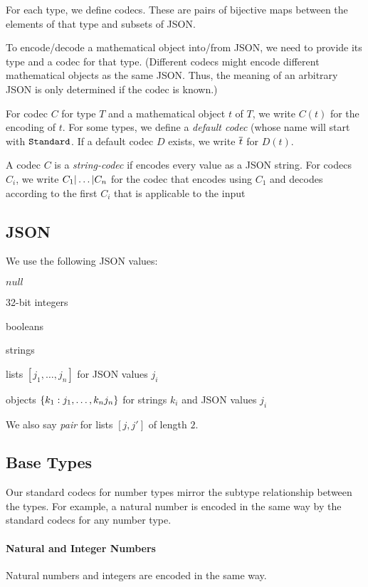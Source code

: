 For each type, we define codecs. These are pairs of bijective maps between the elements of that type and subsets of JSON.

To encode/decode a mathematical object into/from JSON, we need to provide its type and a codec for that type.
(Different codecs might encode different mathematical objects as the same JSON. Thus, the meaning of an arbitrary JSON is only determined if the codec is known.)

For codec $C$ for type $T$ and a mathematical object $t$ of $T$, we write $C(t)$ for the encoding of $t$.
For some types, we define a \emph{default codec} (whose name will start with $\cn{Standard}$.
If a default codec $D$ exists, we write $\ov{t}$ for $D(t)$.

A codec $C$ is a \emph{string-codec} if encodes every value as a JSON string.
For codecs $C_i$, we write $\cunion{C_1,\ldots,C_n}$ for the codec that encodes using $C_1$ and decodes according to the first $C_i$ that is applicable to the input

\subsection{JSON}

We use the following JSON values:
\begin{compactitem}
  \item $null$
  \item 32-bit integers
  \item booleans
  \item strings
  \item lists $[j_1,\ldots,j_n]$ for JSON values $j_i$
  \item objects $\jobj{k_1:j_1,\ldots,k_nj_n}$ for strings $k_i$ and JSON values $j_i$
\end{compactitem}
We also say \emph{pair} for lists $[j,j']$ of length $2$.

\subsection{Base Types}

Our standard codecs for number types mirror the subtype relationship between the types.
For example, a natural number is encoded in the same way by the standard codecs for any number type.

\paragraph{Natural and Integer Numbers}
Natural numbers and integers are encoded in the same way.

